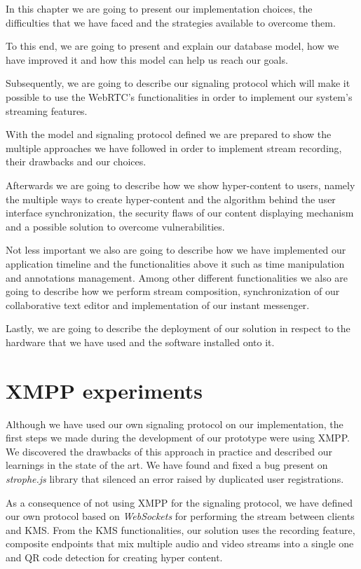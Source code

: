 
In this chapter we are going to present our implementation choices, the difficulties that we have faced and the strategies available to overcome them.

To this end, we are going to present and explain our database model, how we have improved it and how this model can help us reach our goals. 

Subsequently, we are going to describe our signaling protocol which will make it possible to use the \ac{WebRTC}'s functionalities in order to implement our system's streaming features.

With the model and signaling protocol defined we are prepared to show the multiple approaches we have followed in order to implement stream recording, their drawbacks and our choices.

Afterwards we are going to describe how we show hyper-content to users, namely the multiple ways to create hyper-content and the algorithm behind the user interface synchronization, the security flaws of our content displaying mechanism and a possible solution to overcome vulnerabilities. 

Not less important we also are going to describe how we have implemented our application timeline and the functionalities above it such as time manipulation and annotations management. Among other different functionalities we also are going to describe how we perform stream composition, synchronization of our collaborative text editor and implementation of our instant messenger.

Lastly, we are going to describe the deployment of our solution in respect to the hardware that we have used and the software installed onto it.




\section{XMPP experiments}
Although we have used our own signaling protocol on our implementation, the first steps we made during the development of our prototype were using \ac{XMPP}. We discovered the drawbacks of this approach in practice and described our learnings in the state of the art. We have found and fixed a bug present on \emph{strophe.js} library that silenced an error raised by duplicated user registrations.

As a consequence of not using \ac{XMPP} for the signaling protocol, we have defined our own protocol based on \emph{WebSockets} for performing the stream between clients and \ac{KMS}. From the \ac{KMS} functionalities, our solution uses the recording feature, composite endpoints that mix multiple audio and video streams into a single one and \ac{QR} code detection for creating hyper content.





